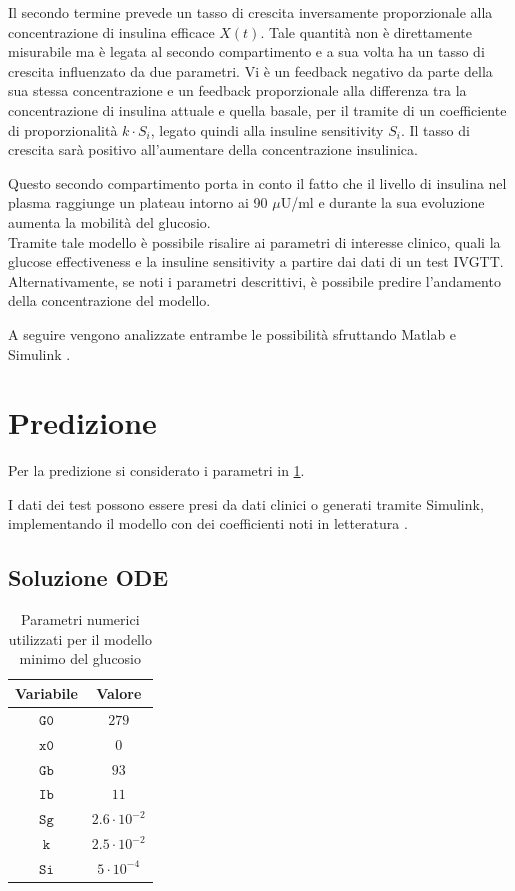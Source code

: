 Il secondo termine prevede un tasso di crescita inversamente proporzionale alla concentrazione di insulina efficace $X(t)$. Tale quantità non è direttamente misurabile ma è legata al secondo compartimento e a sua volta ha un tasso di crescita influenzato da due parametri. Vi è un feedback negativo da parte della sua stessa concentrazione e un feedback proporzionale alla differenza tra la concentrazione di insulina attuale e quella basale, per il tramite di un coefficiente di proporzionalità $k\cdot S_i$, legato quindi alla insuline sensitivity $S_i$. Il tasso di crescita sarà positivo all'aumentare della concentrazione insulinica. 

Questo secondo compartimento porta in conto il fatto che il livello di insulina nel plasma raggiunge un plateau intorno ai 90 $\mu$U/ml e durante la sua evoluzione aumenta la mobilità del glucosio. 
\\

Tramite tale modello è possibile risalire ai parametri di interesse clinico, quali la glucose effectiveness e la insuline sensitivity a partire dai dati di un test IVGTT. Alternativamente, se noti i parametri descrittivi, è possibile predire l'andamento della concentrazione del modello.

A seguire vengono analizzate entrambe le possibilità sfruttando Matlab e Simulink \cite{simulink}.

\section{Predizione}

Per la predizione si considerato i parametri in \cref{tab:parametri}. 

I dati dei test possono essere presi da dati clinici o generati tramite Simulink, implementando il modello con dei coefficienti noti in letteratura \cite{pacini_minmod_1986}. 

\subsection{Soluzione ODE}



\begin{table}[t!]
	\centering
\small{
\begin{tabular}{|c|c|}
	\hline
	Variabile & Valore \\
	\hline
	$\mathtt{G0}$ & $279$ \\
	\hline
	$\mathtt{x0}$ & $0$ \\
	\hline
	$\mathtt{Gb}$ & $93$ \\
	\hline
	$\mathtt{Ib}$ & $11$ \\
	\hline
	$\mathtt{Sg}$ & $2.6\cdot 10^{-2}$ \\
	\hline
	$\mathtt{k}$ & $2.5\cdot 10^{-2}$ \\
	\hline
	$\mathtt{Si}$ & $5\cdot 10^{-4}$ \\
	\hline
\end{tabular}}
\caption{Parametri numerici utilizzati per il modello minimo del glucosio}
\label{tab:parametri}
\end{table}

